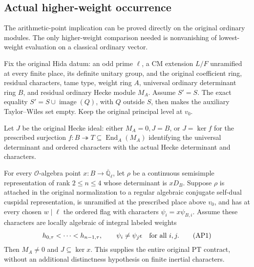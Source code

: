 \subsection{Actual higher-weight occurrence}
\label{sec:selmer-arithmetic-point}

The arithmetic-point implication can be proved directly on the original
ordinary modules.  The only higher-weight comparison needed is
nonvanishing of lowest-weight evaluation on a classical ordinary
vector.

Fix the original Hida datum: an odd prime \(\ell\), a CM extension
\(L/F\) unramified at every finite place, its definite unitary group,
and the original coefficient ring, residual characters, tame type,
weight ring \(A\), universal ordinary determinant ring \(B\), and
residual ordinary Hecke module \(M_A\).  Assume \(S'=S\).  The exact
equality \(S'=S\cup\operatorname{image}(Q)\), with \(Q\) outside
\(S\), then makes the auxiliary Taylor--Wiles set empty.  Keep the
original principal level at \(v_0\).

\begin{proposition}
\label{prop:selmer-arithmetic-point}
Let \(J\) be the original Hecke ideal: either \(M_A=0,J=B\), or
\(J=\ker f\) for the prescribed surjection
\(f:B\twoheadrightarrow T\subseteq\operatorname{End}_A(M_A)\)
identifying the universal determinant and ordered characters with the
actual Hecke determinant and characters.

For every \(\mathcal O\)-algebra point
\(x:B\to\overline{\mathbb Q}_\ell\), let \(\rho\) be a continuous
semisimple representation of rank \(2\leq n\leq4\) whose determinant
is \(xD_B\).  Suppose \(\rho\) is attached in the original normalization
to a regular algebraic conjugate self-dual cuspidal representation,
is unramified at the prescribed place above \(v_0\), and has at every
chosen \(w\mid\ell\) the ordered flag with characters
\(\psi_i=x\psi_{B,i}\).  Assume these characters are locally algebraic
of integral labeled weights
\[
 h_{0,\tau}<\cdots<h_{n-1,\tau},\qquad
                  \psi_i\ne\psi_j\epsilon\quad\hbox{for all }i,j.
                                                        \tag{AP1}
\]
Then \(M_A\ne0\) and \(J\subseteq\ker x\).  This supplies the entire
original \(\mathrm{PT}\) contract, without an additional distinctness
hypothesis on finite inertial characters.
\end{proposition}

